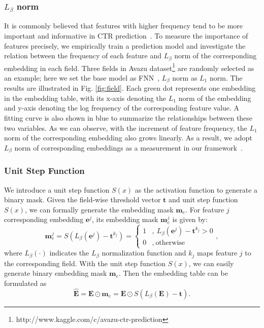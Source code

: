 \documentclass[sigconf]{acmart}
\begin{document}
\subsubsection{$L_{\beta}$ norm}
It is commonly believed that features with higher frequency tend to be more important and informative in CTR prediction~\cite{AMTL,doublehashing}. To measure the importance of features precisely, we empirically train a prediction model and investigate the relation between the frequency of each feature and $L_{\beta}$ norm of the corresponding embedding in each field. Three fields in Avazu dataset\footnote{http://www.kaggle.com/c/avazu-ctr-prediction} are randomly selected as an example; here we set the base model as FNN~\cite{FNN}, $L_{\beta}$ norm as $L_1$ norm. The results are illustrated in Fig. \ref{fig:field}. Each green dot represents one embedding in the embedding table, with its x-axis denoting the $L_1$ norm of the embedding and y-axis denoting the log frequency of the corresponding feature value. A fitting curve is also shown in blue to summarize the relationships between these two variables. As we can observe, with the increment of feature frequency, the $L_1$ norm of the corresponding embedding also grows linearly. As a result, we adopt $L_{\beta}$ norm of corresponding embeddings as a measurement in our framework~\cite{DST,weight_connect}. 



\subsubsection{Unit Step Function}



We introduce a unit step function $S(x)$ as the activation function to generate a binary mask. 
Given the field-wise threshold vector $\mathbf{t}$ and unit step function $S(x)$, we can formally generate the embedding mask $\mathbf{m}_e$. For feature $j$ corresponding embedding $\mathbf{e}^j$, its embedding mask $\mathbf{m}_e^j$ is given by:
\begin{equation}
    \mathbf{m}_e^j = S(L_{\beta}(\mathbf{e}^j)-\mathbf{t}^{k_j}) = \left\{ 
    \begin{aligned}
        1&, \ L_{\beta}(\mathbf{e}^j)-\mathbf{t}^{k_j} > 0 \\
        0&, \ \text{otherwise}
    \end{aligned}
    \right. ,
\end{equation}
where $L_{\beta}(\cdot)$ indicates the $L_{\beta}$ normalization function and $k_j$ maps feature $j$ to the corresponding field. With the unit step function $S(x)$, we can easily generate binary embedding mask $\mathbf{m}_e$. Then the embedding table can be formulated as
\begin{equation}
\label{eq:embedding}
    \mathbf{\hat{E}} = \mathbf{E} \odot \mathbf{m}_e = \mathbf{E} \odot S(L_{\beta}(\mathbf{E})-\mathbf{t}).
\end{equation}
\end{document}

